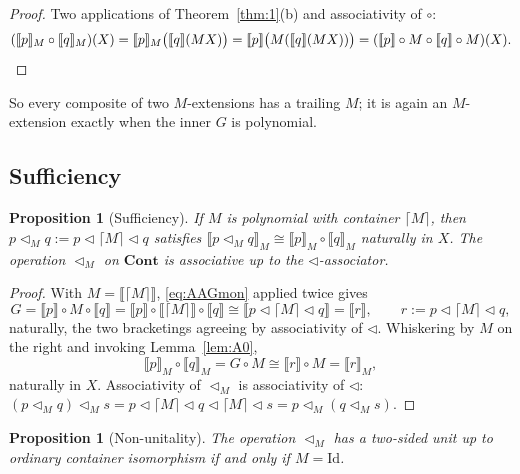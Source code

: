 \documentclass[11pt]{amsart}
\theoremstyle{plain}
\newtheorem{proposition}[theorem]{Proposition}
\theoremstyle{definition}
\newcommand{\Cont}{\mathbf{Cont}}
\newcommand{\ext}[1]{\llbracket #1 \rrbracket}
\newcommand{\extM}[1]{\llbracket #1 \rrbracket_{M}}
\newcommand{\Id}{\mathrm{Id}}
\newcommand{\ceil}[1]{\lceil #1 \rceil}
\begin{document}
\begin{proof}
Two applications of Theorem~\ref{thm:1}(b) and associativity of $\circ$:
\[
  (\extM{p}\circ\extM{q})(X)=\extM{p}\bigl(\ext{q}(MX)\bigr)=\ext{p}\bigl(M(\ext{q}(MX))\bigr)
  =(\ext{p}\circ M\circ\ext{q}\circ M)(X).\qedhere
\]
\end{proof}

So every composite of two $M$-extensions has a trailing $M$; it is again an $M$-extension exactly
when the inner $G$ is polynomial.

\subsection{Sufficiency}\label{sec:suff}
\begin{proposition}[Sufficiency]\label{prop:suff}
If $M$ is polynomial with container $\ceil M$, then $p\triangleleft_M q:=p\triangleleft\ceil
M\triangleleft q$ satisfies $\extM{p\triangleleft_M q}\cong\extM{p}\circ\extM{q}$ naturally in $X$.
The operation $\triangleleft_M$ on $\Cont$ is associative up to the $\triangleleft$-associator.
\end{proposition}

\begin{proof}
With $M=\ext{\ceil M}$, \eqref{eq:AAGmon} applied twice gives
\[
  G=\ext{p}\circ M\circ\ext{q}=\ext{p}\circ\ext{\ceil M}\circ\ext{q}\cong\ext{p\triangleleft\ceil
  M\triangleleft q}=\ext{r},\qquad r:=p\triangleleft\ceil M\triangleleft q,
\]
naturally, the two bracketings agreeing by associativity of $\triangleleft$. Whiskering by $M$ on
the right and invoking Lemma~\ref{lem:A0},
\[
  \extM{p}\circ\extM{q}=G\circ M\cong\ext{r}\circ M=\extM{r},
\]
naturally in $X$. Associativity of $\triangleleft_M$ is associativity of $\triangleleft$:
$(p\triangleleft_M q)\triangleleft_M s=p\triangleleft\ceil M\triangleleft q\triangleleft\ceil
M\triangleleft s=p\triangleleft_M(q\triangleleft_M s)$.
\end{proof}

\begin{proposition}[Non-unitality]\label{prop:nonunit}
The operation $\triangleleft_M$ has a two-sided unit up to ordinary container isomorphism if and only
if $M=\Id$.
\end{proposition}
\end{document}
